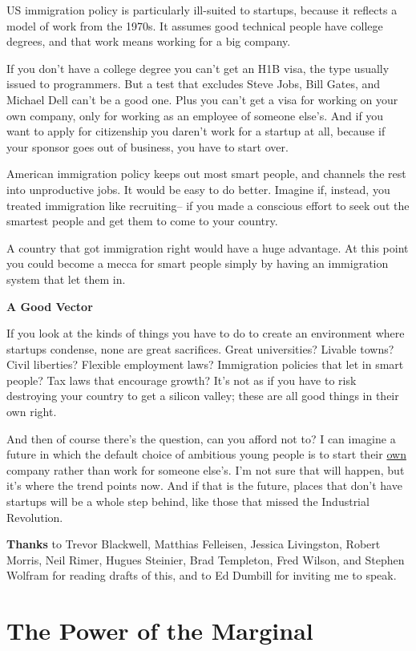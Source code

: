 \documentclass[12pt]{book}
\begin{document}
US immigration policy is particularly ill-suited to startups, because it
reflects a model of work from the 1970s. It assumes good technical
people have college degrees, and that work means working for a big
company.

If you don't have a college degree you can't get an H1B visa, the type
usually issued to programmers. But a test that excludes Steve Jobs, Bill
Gates, and Michael Dell can't be a good one. Plus you can't get a visa
for working on your own company, only for working as an employee of
someone else's. And if you want to apply for citizenship you daren't
work for a startup at all, because if your sponsor goes out of business,
you have to start over.

American immigration policy keeps out most smart people, and channels
the rest into unproductive jobs. It would be easy to do better. Imagine
if, instead, you treated immigration like recruiting-- if you made a
conscious effort to seek out the smartest people and get them to come to
your country.

A country that got immigration right would have a huge advantage. At
this point you could become a mecca for smart people simply by having an
immigration system that let them in.

\textbf{A Good Vector}

If you look at the kinds of things you have to do to create an
environment where startups condense, none are great sacrifices. Great
universities? Livable towns? Civil liberties? Flexible employment laws?
Immigration policies that let in smart people? Tax laws that encourage
growth? It's not as if you have to risk destroying your country to get a
silicon valley; these are all good things in their own right.

And then of course there's the question, can you afford not to? I can
imagine a future in which the default choice of ambitious young people
is to start their \href{hiring.html}{own} company rather than work for
someone else's. I'm not sure that will happen, but it's where the trend
points now. And if that is the future, places that don't have startups
will be a whole step behind, like those that missed the Industrial
Revolution.


\textbf{Thanks} to Trevor Blackwell, Matthias Felleisen, Jessica
Livingston, Robert Morris, Neil Rimer, Hugues Steinier, Brad Templeton,
Fred Wilson, and Stephen Wolfram for reading drafts of this, and to Ed
Dumbill for inviting me to speak.
\chapter{The Power of the Marginal}
\end{document}
